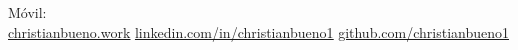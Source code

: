 \begin{center}
  \name{\candidateName} \\[2pt]
  \small\textbf{\candidateTitle} \\[3pt]
  \small
  \candidateLocation \separator{}
  Móvil: \candidatePhone \separator{}
  \href{mailto:\candidateEmail}{\uline{\candidateEmail}} \\
  \href{\candidateWebsiteUrl}{\uline{christianbueno.work}} \separator{}
  \href{\candidateLinkedInUrl}{\uline{linkedin.com/in/christianbueno1}} \separator{}
  \href{\candidateGitHubUrl}{\uline{github.com/christianbueno1}}
\end{center}
